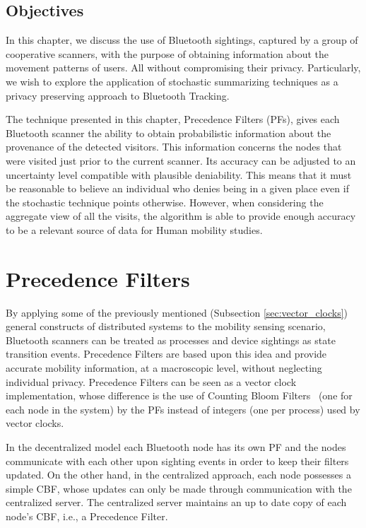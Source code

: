 \subsection{Objectives}
\label{sec:ct-objectives}
In this chapter, we discuss the use of Bluetooth sightings, captured
by a group of cooperative scanners, with the purpose of obtaining
information about the movement patterns of users. All without
compromising their privacy. Particularly, we wish to explore the
application of stochastic summarizing techniques as a privacy preserving
approach to Bluetooth Tracking.

The technique presented in this chapter, Precedence Filters (PFs), gives
each Bluetooth scanner the ability to obtain probabilistic information
about the provenance of the detected visitors. This information
concerns the nodes that were visited just prior to the current
scanner. Its accuracy can be adjusted to an uncertainty level
compatible with plausible deniability. This means that it must be
reasonable to believe an individual who denies being in a given place
even if the stochastic technique points otherwise.
However, when considering the aggregate view of all the visits, the
algorithm is able to provide enough accuracy to be a relevant source
of data for Human mobility studies.

\section{Precedence Filters}
\label{sec:precedence-filters}
By applying some of the previously mentioned (Subsection
\ref{sec:vector_clocks}) general constructs of distributed systems to
the mobility sensing scenario, Bluetooth scanners can be treated as
processes and device sightings as state transition events. Precedence
Filters are based upon this idea and provide accurate mobility
information, at a macroscopic level, without neglecting individual
privacy.  Precedence Filters can be seen as a vector clock
\cite{Fidge,Mattern} implementation, whose difference is the use of
Counting Bloom Filters~\cite{Fan98summarycache:,Mitzenmacher:2002:CBF:581876.581878} (one for each node in the system) by the PFs
instead of integers (one per process) used by vector clocks.

In the decentralized model each Bluetooth node has its own PF and the
nodes communicate with each other upon sighting events in order to
keep their filters updated. On the other hand, in the centralized
approach, each node possesses a simple CBF, whose updates can only be
made through communication with the centralized server.  The
centralized server maintains an up to date copy of each node's CBF,
i.e., a Precedence Filter.

